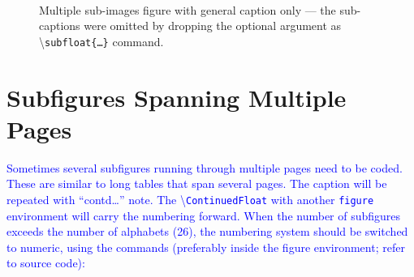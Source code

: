 \documentclass[phd]{ndsu-thesis-2022}
\newcommand\italk[1]{\textcolor{blue}{#1}}  %
\newcommand\cmd[1]{\textbackslash\texttt{#1}}  %
\begin{document}
\begin{figure}[H]
\hspace{0.25in}
\hspace{0.25in}
\hspace{0.25in}
\hspace{0.25in}
\hspace{0.25in}\\

\captionsetup{singlelinecheck=false} %
\caption{Multiple sub-images figure with general caption only  --- the sub-captions were omitted by dropping the optional argument as \cmd{subfloat\{\ldots\}} command.} \label{fig6a}
\end{figure}


\section{Subfigures Spanning Multiple Pages}
\italk{Sometimes several subfigures running through multiple pages need to be coded. These are similar to long tables that span several pages. The caption will be repeated with ``contd\ldots'' note. The \cmd{ContinuedFloat} with another \texttt{figure} environment will carry the numbering forward. When the number of subfigures exceeds the number of alphabets (26), the numbering system should be switched to numeric, using the commands (preferably inside the figure environment; refer to source code): }
\end{document}
